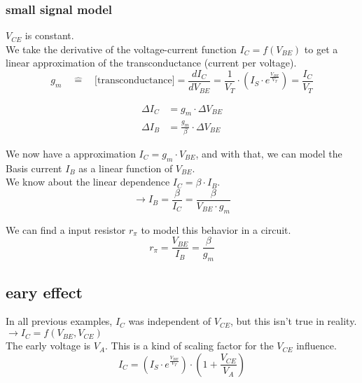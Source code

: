 \documentclass[11ypt]{extarticle}
\begin{document}
\subsubsection{small signal model}
$V_{CE}$ is constant.
\\
We take the derivative of the voltage-current function $I_C = f(V_{BE})$ to get a linear approximation of the transconductance (current per voltage).
\begin{equation} \label{gm_formula}
    g_m \quad \widehat{=} \quad \text{[transconductance]} = \frac{dI_C}{dV_{BE}} = \frac{1} {V_T} \cdot \left( I_S \cdot e^{\frac{V_{BE}}{V_T}} \right) = \frac{I_C}{V_T}
\end{equation}

\begin{equation}
    \begin{aligned}
    \Delta I_C &= g_m \cdot \Delta V_{BE}
    \\
    \Delta I_B &= \frac{g_m}{\beta} \cdot \Delta V_{BE}
\end{aligned}
\end{equation}

We now have a approximation $I_C = g_m \cdot V_{BE}$, and with that, we can model the Basis current $I_B$ as a linear function of $V_{BE}$.
\\
We know about the linear dependence $I_C = \beta \cdot I_B$.
\begin{equation}
    \rightarrow I_B = \frac{\beta}{I_C} = \frac{\beta}{V_{BE} \cdot g_m}
\end{equation}

We can find a input resistor $r_\pi$ to model this behavior in a circuit.
\begin{equation} \label{r_pi_formula}
    r_\pi = \frac{V_{BE}}{I_B} = \frac{\beta}{g_m} 
\end{equation}

\subsection{eary effect}

In all previous examples, $I_C$ was independent of $V_{CE}$, but this isn't true in reality.
$\rightarrow I_C = f(V_{BE}, V_{CE})$
\\
The early voltage is $V_A$. This is a kind of scaling factor for the $V_{CE}$ influence.
\begin{equation}
    I_C = \left( I_S \cdot e^{\frac{V_{BE}}{V_T}} \right) \cdot \left( 1 + \frac{V_{CE}}{V_A} \right)
\end{equation}
\end{document}
